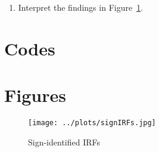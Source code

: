 \documentclass{article}
\begin{document}
\begin{enumerate}
\item Interpret the findings in Figure~\ref{fig:signSVAR}.
\end{enumerate}

\newpage

\appendix

\newpage
\section{Codes}

\newpage

\section{Figures}
\begin{figure}[h]\caption[]{Sign-identified IRFs}\label{fig:signSVAR}
\texttt{[image: ../plots/signIRFs.jpg]}
\end{figure}
\newpage

\printbibliography%
\end{document}
